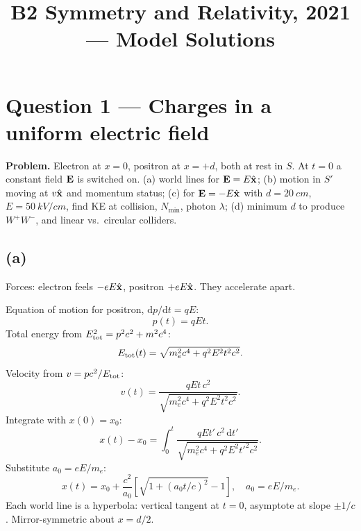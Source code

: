 \documentclass[11pt]{article}
\title{B2 Symmetry and Relativity, 2021 --- Model Solutions}
\author{}
\date{}
\newcommand{\de}{\mathrm{d}}
\begin{document}
\maketitle

\section*{Question 1 --- Charges in a uniform electric field}

\textbf{Problem.} Electron at $x=0$, positron at $x=+d$, both at rest in $S$. At $t=0$ a constant field $\vb E$ is switched on. (a) world lines for $\vb E=E\hat{\vb x}$; (b) motion in $S'$ moving at $v\hat{\vb x}$ and momentum status; (c) for $\vb E=-E\hat{\vb x}$ with $d=\SI{20}{cm}$, $E=\SI{50}{kV/cm}$, find KE at collision, $N_{\min}$, photon $\lambda$; (d) minimum $d$ to produce $W^+W^-$, and linear vs.\ circular colliders.

\subsection*{(a)}

Forces: electron feels $-eE\hat{\vb x}$, positron $+eE\hat{\vb x}$. They accelerate apart.

Equation of motion for positron, $\de p/\de t = qE$:
\[ p(t) = qEt. \]
Total energy from $E_{\rm tot}^2=p^2c^2+m^2c^4$:
\[ E_{\rm tot}(t) = \sqrt{m_e^2 c^4 + q^2 E^2 t^2 c^2}. \]
Velocity from $v = p c^2/E_{\rm tot}$:
\[ v(t) = \frac{qEt\,c^2}{\sqrt{m_e^2 c^4 + q^2 E^2 t^2 c^2}}. \]
Integrate with $x(0)=x_0$:
\[ x(t) - x_0 = \int_0^t \frac{qEt'\,c^2\,\de t'}{\sqrt{m_e^2 c^4 + q^2 E^2 t'^2 c^2}}. \]
Substitute $a_0 = eE/m_e$:
\begin{equation}
x(t) = x_0 + \frac{c^2}{a_0}\!\left[\sqrt{1+(a_0 t/c)^2}-1\right],\quad a_0=eE/m_e.
\label{eq:hyperbolic}
\end{equation}
Each world line is a hyperbola: vertical tangent at $t=0$, asymptote at slope $\pm 1/c$. Mirror-symmetric about $x=d/2$.

\begin{center}
\end{center}
\end{document}
